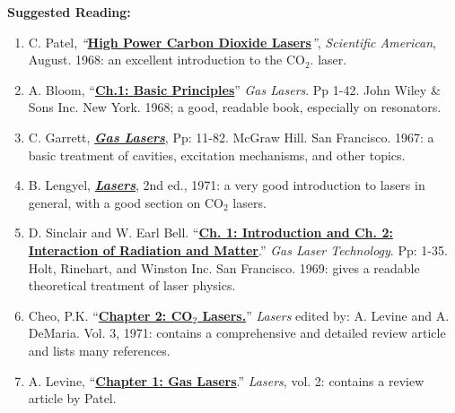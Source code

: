 \documentclass{../lab}
\begin{document}
\noindent\textbf{Suggested Reading:}

\begin{enumerate}
    \item C. Patel, \emph{``}\href{http://physics111.lib.berkeley.edu/Physics111/Reprints/CO2/01-High\_Power\_Carbon\_Dioxide\_Lasers.pdf}{\textbf{High Power Carbon Dioxide Lasers}}\emph{''}, \emph{Scientific American}, August. 1968: an excellent introduction to the CO$_2$. laser.

    \item A. Bloom, ``\href{http://physics111.lib.berkeley.edu/Physics111/Reprints/CO2/CO2\_ch1\_A\_Bloom\_Basic\%20Principles.pdf}{\textbf{Ch.1: Basic Principles}}'' \emph{Gas Lasers}. Pp 1-42. John Wiley \& Sons Inc. New York. 1968; a good, readable book, especially on resonators.

    \item C. Garrett, \emph{\href{http://physics111.lib.berkeley.edu/Physics111/Reprints/CO2/CO2\%20OCR\%20Gas\%20Lasers\%20Garrett\%20pg.\%2011-82.pdf}{\textbf{Gas Lasers}}}, Pp: 11-82. McGraw Hill. San Francisco. 1967: a basic treatment of cavities, excitation mechanisms, and other topics.

    \item B. Lengyel, \emph{\href{http://physics111.lib.berkeley.edu/Physics111/Reprints/CO2/02-Gas\_Lasers.pdf}{\textbf{Lasers}}}, 2nd ed., 1971: a very good introduction to lasers in general, with a good section on CO$_2$ lasers.

    \item D. Sinclair and W. Earl Bell. ``\href{http://physics111.lib.berkeley.edu/Physics111/Reprints/CO2/CO2\%20\%20OCR\%20ch1\%20and\%202\_Sinclair\_Bell.pdf}{\textbf{Ch. 1: Introduction and Ch. 2: Interaction of Radiation and Matter}}.'' \emph{Gas Laser Technology}. Pp: 1-35. Holt, Rinehart, and Winston Inc. San Francisco. 1969: gives a readable theoretical treatment of laser physics.

    \item Cheo, P.K. ``\href{http://physics111.lib.berkeley.edu/Physics111/Reprints/CO2/03-CO2\_Lasers.pdf}{\textbf{Chapter 2: CO$_2$ Lasers.}}'' \emph{Lasers} edited by: A. Levine and A. DeMaria. Vol. 3, 1971: contains a comprehensive and detailed review article and lists many references.

    \item A. Levine, ``\href{http://physics111.lib.berkeley.edu/Physics111/Reprints/Lasers\%20Vol\%202\%20Levine/Chapter\%201\%20Gas\%20lasers\%20CKN\%20Patel.pdf}{\textbf{Chapter 1: Gas Lasers}}.'' \emph{Lasers}, vol. 2: contains a review article by Patel.


\end{enumerate}
\end{document}
